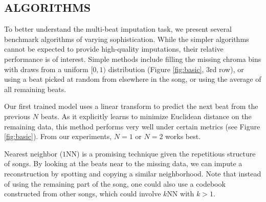 \documentclass{article}
\begin{document}
\subsection{ALGORITHMS}
\label{ssec:algo}

To better understand the multi-beat imputation task, we present 
several benchmark algorithms of varying sophistication.  While the simpler 
algorithms cannot be expected to provide high-quality imputations, 
their relative performance is of interest.  Simple methods include
filling the missing chroma bins with draws from a uniform $[0,1)$
distribution (Figure \ref{fig:basic}, $3$rd row), or using a beat picked 
at random from elsewhere in the song, or using
the average of all remaining beats.

Our first trained model uses a linear transform to predict the next beat from the previous $N$ beats.
As it explicitly learns to minimize Euclidean distance on the remaining 
data, this method performs very well under certain metrics (see Figure
\ref{fig:basic}). From our experiments, $N=1$ or $N=2$ works best.

Nearest neighbor ($1$NN) is a promising technique given 
the repetitious structure of songs.  By looking at the beats near to 
the missing data, we can impute a reconstruction by spotting and copying a similar
neighborhood. Note that instead of using the remaining part of the song,
one could also use a codebook constructed from other songs, which 
could involve $k$NN with $k>1$. %
\end{document}
